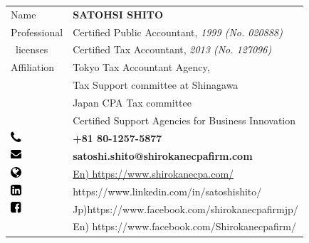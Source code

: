 \begin{table}[h]
  \begin{tabular}{lll}
Name & {\sffamily \bfseries SATOHSI SHITO} & \\
Professional & \multicolumn{2}{l}{Certified Public Accountant, \textit{1999 (No. 020888)}} \\
\ licenses       & \multicolumn{2}{l}{Certified Tax Accountant, \textit{2013 (No. 127096)}} \\
Affiliation  & \multicolumn{2}{l}{Tokyo Tax Accountant Agency,} \\
 & \multicolumn{2}{l}{Tax Support committee at Shinagawa} \\
         & \multicolumn{2}{l}{Japan CPA Tax committee} \\
         & \multicolumn{2}{l}{Certified Support Agencies for Business Innovation} \\
\includegraphics[width=4mm]{phone.png} & {\sffamily \bfseries +81 80-1257-5877} & \\
\includegraphics[width=4mm]{mail.png} & {\sffamily \bfseries satoshi.shito@shirokanecpafirm.com} & \\
\includegraphics[width=4mm]{website.png} & \multicolumn{2}{l}{\href{https://www.shirokanecpa.com/}{En) https://www.shirokanecpa.com/}} \\
\includegraphics[width=4mm]{linkedin.png} & \multicolumn{2}{l}{https://www.linkedin.com/in/satoshishito/} \\    
\includegraphics[width=4mm]{facebook.png} & \multicolumn{2}{l}{Jp)https://www.facebook.com/shirokanecpafirmjp/} \\
            & \multicolumn{2}{l}{En) https://www.facebook.com/Shirokanecpafirm/} \\   
  \end{tabular}
\end{table}

